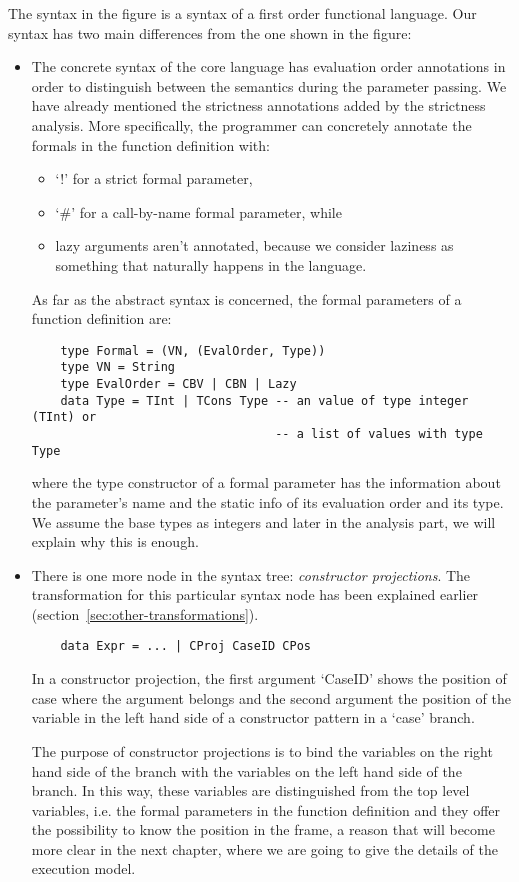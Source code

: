 \documentclass[diploma]{softlab-thesis}
\begin{document}
The syntax in the figure is a syntax of a first order functional language. Our syntax has two main 
differences from the one shown in the figure:
\begin{itemize}
  \item The concrete syntax of the core language has evaluation order annotations in order to 
  distinguish between the semantics during the parameter passing. We have already mentioned the 
  strictness annotations added by the strictness analysis. 
  More specifically, the programmer can concretely annotate the formals in the function definition with:
    \begin{itemize}
      \item {`!' for a strict formal parameter,}
      \item { `\#' for a call-by-name formal parameter, while}
      \item {lazy arguments aren't annotated, because we consider laziness as something that naturally happens 
      in the language.}
    \end{itemize}
  
  As far as the abstract syntax is concerned, the formal parameters of a function definition are:
  \begin{verbatim}
    type Formal = (VN, (EvalOrder, Type))
    type VN = String 
    type EvalOrder = CBV | CBN | Lazy 
    data Type = TInt | TCons Type -- an value of type integer (TInt) or 
                                  -- a list of values with type Type
  \end{verbatim}
  where the type constructor of a formal parameter has the information about the parameter's name and 
  the static info of its evaluation order and its type. We assume the base types as integers and later in 
  the analysis part, we will explain why this is enough.

  \item There is one more node in the syntax tree: \textit{constructor projections}. The transformation for this 
  particular syntax node has been explained earlier (section~\ref{sec:other-transformations}). 
  \begin{verbatim}
    data Expr = ... | CProj CaseID CPos 
  \end{verbatim}
  In a constructor projection, the first argument `CaseID' shows the position of case where the argument belongs
  and the second argument the position of the variable in the left hand side of a constructor pattern in a `case' branch.
  
  The purpose of constructor projections is to bind the variables on the right hand side of the branch with the variables 
  on the left hand side of the branch. In this way, these variables are distinguished from the top level variables, i.e.
  the formal parameters in the function definition and they offer the possibility to know the position in the frame, 
  a reason that will become more clear in the next chapter, where we are going to give the details of the 
  execution model.
\end{itemize}
\end{document}
